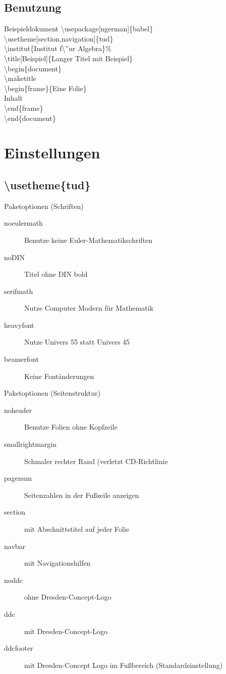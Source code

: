\documentclass[presentation,t]{beamer}
\begin{document}
\subsection{Benutzung}
\label{sec:org46be8ca}
\begin{frame}[label={sec:org0bb5c80}]{Beispieldokument}
\textbackslash usepackage[ngerman]\{babel\}\\
\textbackslash usetheme[section,navigation]\{tud\}\\
\textbackslash institut\{Institut f\textbackslash ''ur Algebra\}\%\\
\textbackslash title[Beispiel]\{Langer Titel mit Beispiel\}\\
\textbackslash begin\{document\}\\
\textbackslash maketitle\\
\textbackslash begin\{frame\}\{Eine Folie\}\\
Inhalt\\
\textbackslash end\{frame\}\\
\textbackslash end\{document\}\\
\end{frame}

\section{Einstellungen}
\label{sec:org7eb05c9}
\subsection{\textbackslash usetheme\{tud\}}
\label{sec:org609bb8c}
\begin{frame}[label={sec:orgb450ea2}]{Paketoptionen (Schriften)}
\begin{description}
\item[{noeulermath}] Benutze keine Euler-Mathematikschriften
\item[{noDIN}] Titel ohne DIN bold
\item[{serifmath}] Nutze Computer Modern für Mathematik
\item[{heavyfont}] Nutze Univers 55 statt Univers 45
\item[{beamerfont}] Keine Fontänderungen
\end{description}
\end{frame}
\begin{frame}[label={sec:org8369dc7}]{Paketoptionen (Seitenstruktur)}
\begin{description}
\item[{noheader}] Benutze Folien ohne Kopfzeile
\item[{smallrightmargin}] Schmaler rechter Rand (verletzt CD-Richtlinie
\item[{pagenum}] Seitenzahlen in der Fußzeile anzeigen
\item[{section}] mit Abschnittstitel auf jeder Folie
\item[{navbar}] mit Navigationshilfen
\item[{noddc}] ohne Dresden-Concept-Logo
\item[{ddc}] mit Dresden-Concept-Logo
\item[{ddcfooter}] mit Dresden-Concept Logo im Fußbereich (Standardeinstellung)
\end{description}
\end{frame}
\end{document}

